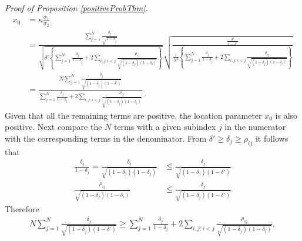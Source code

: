 \documentclass[11pt]{article}
\theoremstyle{definition}
\theoremstyle{definition}
\begin{document}
\textit{Proof of Proposition \ref{positiveProbThm}.}
\begin{align*}
x_0 &= \kappa \frac{\sigma_1}{\sigma_2} \\
 &= \frac{ \sum_{j=1}^N \frac{\delta_j}{\sqrt{1-\delta_j}}}{\sqrt{\delta'  \left\{ \sum_{j=1}^N \frac{\delta_j}{1-\delta_j} + 2 \sum_{i,j: i<j} \frac{\rho_{ij}}{\sqrt{(1-\delta_j)(1-\delta_i)}}\right\}}} \sqrt{\frac{\frac{\delta'}{1-\delta'}}{\frac{1}{N^2} \left\{ \sum_{j=1}^N \frac{\delta_j}{1-\delta_j} + 2 \sum_{i,j: i<j} \frac{\rho_{ij}}{\sqrt{(1-\delta_j)(1-\delta_i)}}\right\} }}\\
&=  \frac{N \sum_{j=1}^N \frac{\delta_j}{\sqrt{(1-\delta_j)(1-\delta')}}}{ \sum_{j=1}^N \frac{\delta_j}{1-\delta_j} + 2 \sum_{i,j: i<j} \frac{\rho_{ij}}{\sqrt{(1-\delta_j)(1-\delta_i)}}}
\end{align*}
Given that all the remaining terms are positive, the location parameter $x_0$ is also positive. Next compare the $N$ terms with a given subindex $j$ in the numerator with the corresponding terms in the denominator. From $\delta' \geq \delta_j \geq \rho_{ij}$ it follows that 
\begin{align}
\frac{\delta_j}{1-\delta_j} = \frac{\delta_j}{\sqrt{(1-\delta_j)(1-\delta_j)}} &\leq \frac{\delta_j}{\sqrt{(1-\delta_j)(1-\delta')}} \label{ProofIneq1}\\
 \frac{\rho_{ij}}{\sqrt{(1-\delta_j)(1-\delta_i)}} &\leq \frac{\delta_j}{\sqrt{(1-\delta_j)(1-\delta')}} \label{ProofIneq2}
\end{align}
Therefore 
\begin{align*}
N \sum_{j=1}^N \frac{\delta_j}{\sqrt{(1-\delta_j)(1-\delta')}} \geq \sum_{j=1}^N \frac{\delta_j}{1-\delta_j} + 2 \sum_{i,j: i<j} \frac{\rho_{ij}}{\sqrt{(1-\delta_j)(1-\delta_i)}},
\end{align*}
\end{document}
